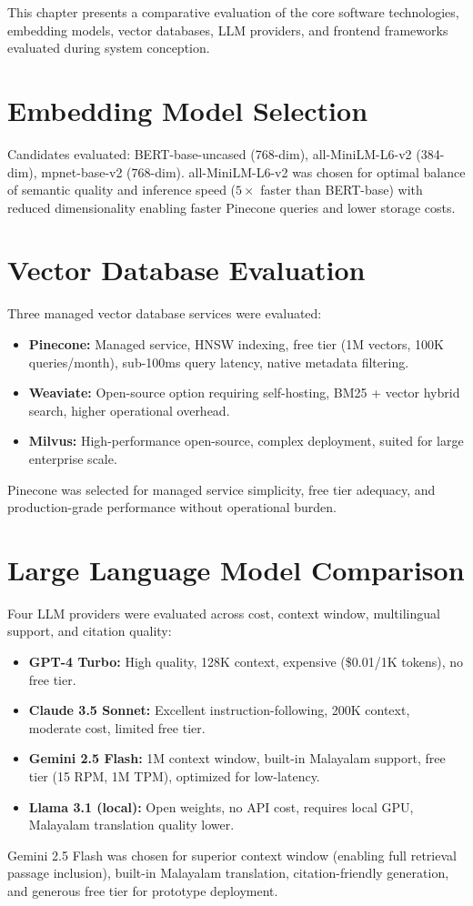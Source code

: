 \documentclass[12pt,a4paper]{report}
\begin{document}
This chapter presents a comparative evaluation of the core software technologies, embedding models, vector databases, LLM providers, and frontend frameworks evaluated during system conception.

\section{Embedding Model Selection}
Candidates evaluated: BERT-base-uncased (768-dim), all-MiniLM-L6-v2 (384-dim), mpnet-base-v2 (768-dim). all-MiniLM-L6-v2 was chosen for optimal balance of semantic quality and inference speed ($5\times$ faster than BERT-base) with reduced dimensionality enabling faster Pinecone queries and lower storage costs.

\section{Vector Database Evaluation}
Three managed vector database services were evaluated:
\begin{itemize}
    \item \textbf{Pinecone:} Managed service, HNSW indexing, free tier (1M vectors, 100K queries/month), sub-100ms query latency, native metadata filtering.
    \item \textbf{Weaviate:} Open-source option requiring self-hosting, BM25 + vector hybrid search, higher operational overhead.
    \item \textbf{Milvus:} High-performance open-source, complex deployment, suited for large enterprise scale.
\end{itemize}
Pinecone was selected for managed service simplicity, free tier adequacy, and production-grade performance without operational burden.

\section{Large Language Model Comparison}
Four LLM providers were evaluated across cost, context window, multilingual support, and citation quality:
\begin{itemize}
    \item \textbf{GPT-4 Turbo:} High quality, 128K context, expensive (\$0.01/1K tokens), no free tier.
    \item \textbf{Claude 3.5 Sonnet:} Excellent instruction-following, 200K context, moderate cost, limited free tier.
    \item \textbf{Gemini 2.5 Flash:} 1M context window, built-in Malayalam support, free tier (15 RPM, 1M TPM), optimized for low-latency.
    \item \textbf{Llama 3.1 (local):} Open weights, no API cost, requires local GPU, Malayalam translation quality lower.
\end{itemize}
Gemini 2.5 Flash was chosen for superior context window (enabling full retrieval passage inclusion), built-in Malayalam translation, citation-friendly generation, and generous free tier for prototype deployment.
\end{document}

